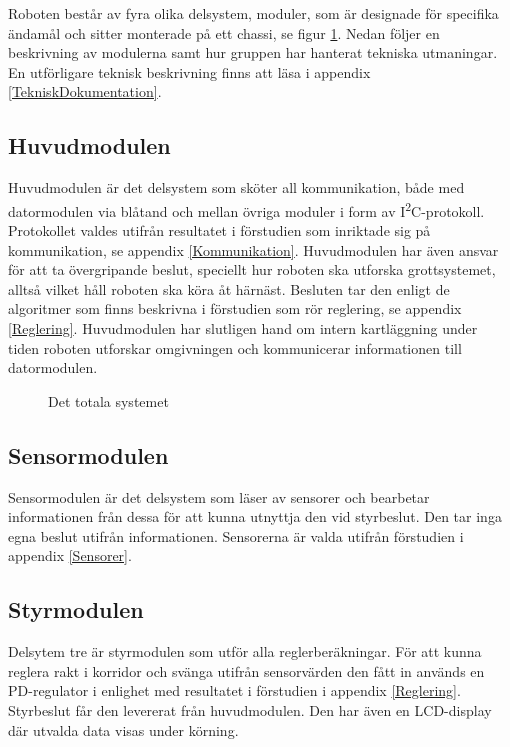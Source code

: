 \documentclass[11pt]{article}
\begin{document}
\begin{flushleft}
Roboten består av fyra olika delsystem, moduler, som är designade för specifika ändamål och sitter monterade på ett chassi, se figur \ref{overview}. Nedan följer en beskrivning av modulerna samt hur gruppen har hanterat tekniska utmaningar. En utförligare teknisk beskrivning finns att läsa i appendix \ref{TekniskDokumentation}. 


\subsection{Huvudmodulen}
Huvudmodulen är det delsystem som sköter all kommunikation, både med datormodulen via blåtand och mellan övriga moduler i form av I\textsuperscript{2}C-protokoll. Protokollet valdes utifrån resultatet i förstudien som inriktade sig på kommunikation, se appendix \ref{Kommunikation}. Huvudmodulen har även ansvar för att ta övergripande beslut, speciellt hur roboten ska utforska grottsystemet, alltså vilket håll roboten ska köra åt härnäst. Besluten tar den enligt de algoritmer som finns beskrivna i förstudien som rör reglering, se appendix \ref{Reglering}. Huvudmodulen har slutligen hand om intern kartläggning under tiden roboten utforskar omgivningen och kommunicerar informationen till datormodulen. 

\begin{figure}[!htbp]
\centering
\noindent\resizebox{.7\linewidth}{!}{
	}
	\caption{Det totala systemet \label{overview}}	
\end{figure}

\subsection{Sensormodulen}
Sensormodulen är det delsystem som läser av sensorer och bearbetar informationen från dessa för att kunna utnyttja den vid styrbeslut. Den tar inga egna beslut utifrån informationen. Sensorerna är valda utifrån förstudien i appendix \ref{Sensorer}. 

\subsection{Styrmodulen}
Delsytem tre är styrmodulen som utför alla reglerberäkningar. För att kunna reglera rakt i korridor och svänga utifrån sensorvärden den fått in används en PD-regulator i enlighet med resultatet i förstudien i appendix \ref{Reglering}. Styrbeslut får den levererat från huvudmodulen. Den har även en LCD-display där utvalda data visas under körning. 


\end{flushleft}
\end{document}
